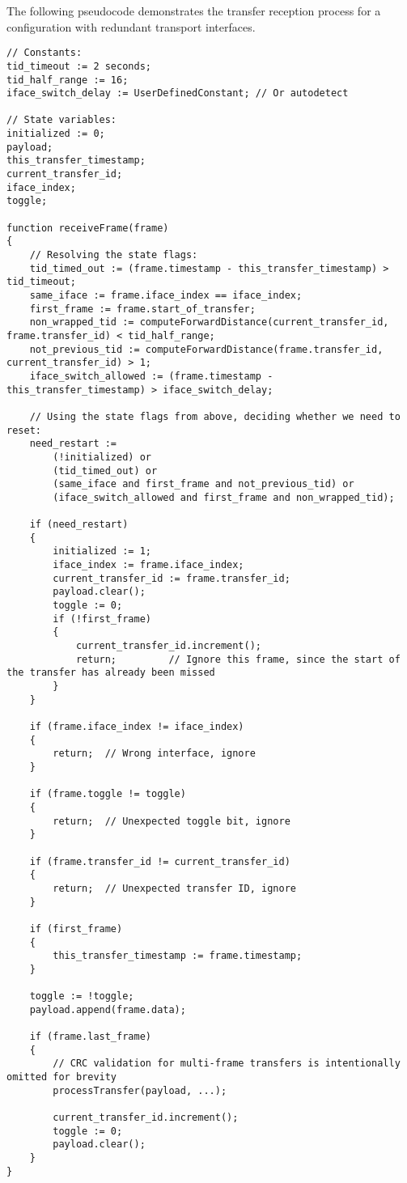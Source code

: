 The following pseudocode demonstrates the transfer reception process
for a configuration with redundant transport interfaces.

\clearpage
\begin{verbatim}
// Constants:
tid_timeout := 2 seconds;
tid_half_range := 16;
iface_switch_delay := UserDefinedConstant; // Or autodetect

// State variables:
initialized := 0;
payload;
this_transfer_timestamp;
current_transfer_id;
iface_index;
toggle;

function receiveFrame(frame)
{
    // Resolving the state flags:
    tid_timed_out := (frame.timestamp - this_transfer_timestamp) > tid_timeout;
    same_iface := frame.iface_index == iface_index;
    first_frame := frame.start_of_transfer;
    non_wrapped_tid := computeForwardDistance(current_transfer_id, frame.transfer_id) < tid_half_range;
    not_previous_tid := computeForwardDistance(frame.transfer_id, current_transfer_id) > 1;
    iface_switch_allowed := (frame.timestamp - this_transfer_timestamp) > iface_switch_delay;

    // Using the state flags from above, deciding whether we need to reset:
    need_restart :=
        (!initialized) or
        (tid_timed_out) or
        (same_iface and first_frame and not_previous_tid) or
        (iface_switch_allowed and first_frame and non_wrapped_tid);

    if (need_restart)
    {
        initialized := 1;
        iface_index := frame.iface_index;
        current_transfer_id := frame.transfer_id;
        payload.clear();
        toggle := 0;
        if (!first_frame)
        {
            current_transfer_id.increment();
            return;         // Ignore this frame, since the start of the transfer has already been missed
        }
    }

    if (frame.iface_index != iface_index)
    {
        return;  // Wrong interface, ignore
    }

    if (frame.toggle != toggle)
    {
        return;  // Unexpected toggle bit, ignore
    }

    if (frame.transfer_id != current_transfer_id)
    {
        return;  // Unexpected transfer ID, ignore
    }

    if (first_frame)
    {
        this_transfer_timestamp := frame.timestamp;
    }

    toggle := !toggle;
    payload.append(frame.data);

    if (frame.last_frame)
    {
        // CRC validation for multi-frame transfers is intentionally omitted for brevity
        processTransfer(payload, ...);

        current_transfer_id.increment();
        toggle := 0;
        payload.clear();
    }
}
\end{verbatim}

